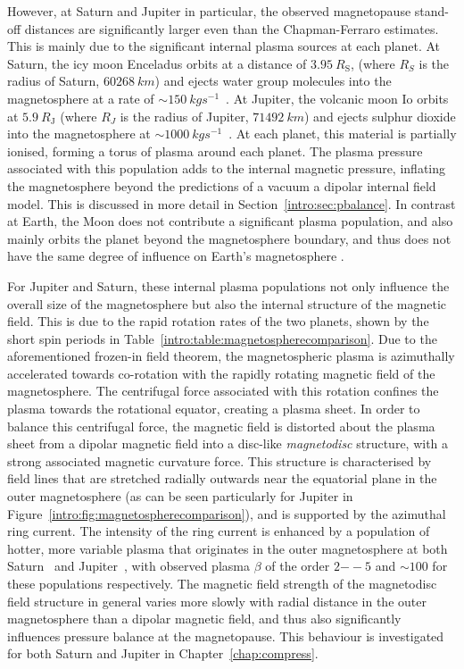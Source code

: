 However, at Saturn and Jupiter in particular, the observed magnetopause stand-off distances are significantly larger even than the Chapman-Ferraro estimates. This is mainly due to the significant internal plasma sources at each planet. At Saturn, the icy moon Enceladus orbits at a distance of $\SI{3.95}{R_\mathrm{S}}$, (where $\si{R_S}$ is the radius of Saturn, $\SI{60268}{km}$) and ejects water group molecules into the magnetosphere at a rate of ${\sim}\SI{150}{kg s^{-1}}$~\citep{tokar2006,dougherty2006}. At Jupiter, the volcanic moon Io orbits at $\SI{5.9}{R_\mathrm{J}}$ (where $\si{R_J}$ is the radius of Jupiter, $\SI{71492}{km}$) and ejects sulphur dioxide into the magnetosphere at ${\sim}\SI{1000}{kg s^{-1}}$~\citep{bagenal2011}. At each planet, this material is partially ionised, forming a torus of plasma around each planet. The plasma pressure associated with this population adds to the internal magnetic pressure, inflating the magnetosphere beyond the predictions of a vacuum a dipolar internal field model. This is discussed in more detail in Section~\ref{intro:sec:pbalance}. In contrast at Earth, the Moon does not contribute a significant plasma population, and also mainly orbits the planet beyond the magnetosphere boundary, and thus does not have the same degree of influence on Earth's magnetosphere  \citep[e.g.][]{schneider1967}.

For Jupiter and Saturn, these internal plasma populations not only influence the overall size of the magnetosphere but also the internal structure of the magnetic field. This is due to the rapid rotation rates of the two planets, shown by the short spin periods in Table~\ref{intro:table:magnetospherecomparison}. Due to the aforementioned frozen-in field theorem, the magnetospheric plasma is azimuthally accelerated towards co-rotation with the rapidly rotating magnetic field of the magnetosphere. The centrifugal force associated with this rotation confines the plasma towards the rotational equator, creating a plasma sheet. In order to balance this centrifugal force, the magnetic field is distorted about the plasma sheet from a dipolar magnetic field into a disc-like \textit{magnetodisc} structure, with a strong associated magnetic curvature force. This structure  is characterised by field lines that are stretched radially outwards near the equatorial plane in the outer magnetosphere (as can be seen particularly for Jupiter in Figure~\ref{intro:fig:magnetospherecomparison}), and is supported by the azimuthal ring current. The intensity of the ring current is enhanced by a population of hotter, more variable plasma that originates in the outer magnetosphere at both Saturn~\citep[e.g.][]{sergis2010} and Jupiter~\citep[e.g.][]{mauk2004}, with observed plasma $\beta$ of the order $2{--}5$ and ${\sim}100$ for these populations respectively. The magnetic field strength of the magnetodisc field structure in general varies more slowly with radial distance in the outer magnetosphere than a dipolar magnetic field, and thus also significantly influences pressure balance at the magnetopause. This behaviour is investigated for both Saturn and Jupiter in Chapter~\ref{chap:compress}. 

